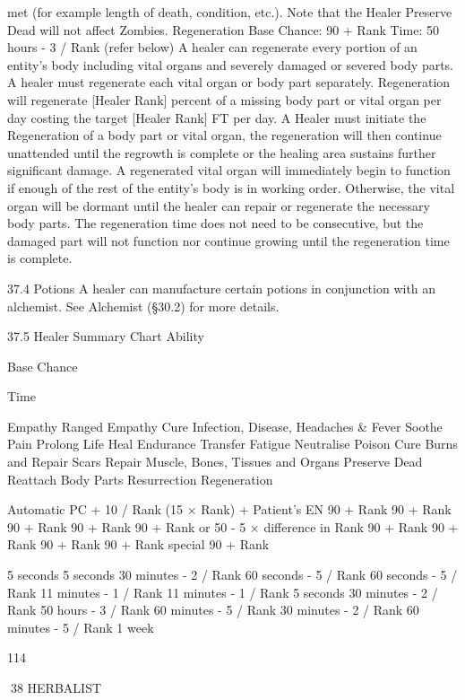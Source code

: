 \documentclass[a4paper]{article}
\begin{document}
\begin{multicols}{3}
met (for example length of death, condition, etc.).
Note that the Healer Preserve Dead will not affect
Zombies.
Regeneration
Base Chance: 90 + Rank
Time: 50 hours - 3 / Rank (refer below)
A healer can regenerate every portion of an entity’s
body including vital organs and severely damaged
or severed body parts. A healer must regenerate
each vital organ or body part separately.
Regeneration will regenerate [Healer Rank] percent of a missing body part or vital organ per day
costing the target [Healer Rank] FT per day. A
Healer must initiate the Regeneration of a body
part or vital organ, the regeneration will then continue unattended until the regrowth is complete or
the healing area sustains further significant damage.
A regenerated vital organ will immediately begin
to function if enough of the rest of the entity’s
body is in working order. Otherwise, the vital
organ will be dormant until the healer can repair or
regenerate the necessary body parts. The regeneration time does not need to be consecutive, but the
damaged part will not function nor continue growing until the regeneration time is complete.

37.4 Potions
A healer can manufacture certain potions in conjunction with an alchemist. See Alchemist (§30.2)
for more details.

37.5 Healer Summary Chart
Ability

Base Chance

Time

Empathy
Ranged Empathy
Cure Infection, Disease, Headaches & Fever
Soothe Pain
Prolong Life
Heal Endurance
Transfer Fatigue
Neutralise Poison
Cure Burns and Repair Scars
Repair Muscle, Bones, Tissues and Organs
Preserve Dead
Reattach Body Parts
Resurrection
Regeneration

Automatic
PC + 10 / Rank
(15 × Rank) + Patient’s EN
90 + Rank
90 + Rank
90 + Rank
90 + Rank
90 + Rank or 50 - 5 × difference in Rank
90 + Rank
90 + Rank
90 + Rank
90 + Rank
special
90 + Rank

5 seconds
5 seconds
30 minutes - 2 / Rank
60 seconds - 5 / Rank
60 seconds - 5 / Rank
11 minutes - 1 / Rank
11 minutes - 1 / Rank
5 seconds
30 minutes - 2 / Rank
50 hours - 3 / Rank
60 minutes - 5 / Rank
30 minutes - 2 / Rank
60 minutes - 5 / Rank
1 week

114

38 HERBALIST


\end{multicols}
\end{document}
